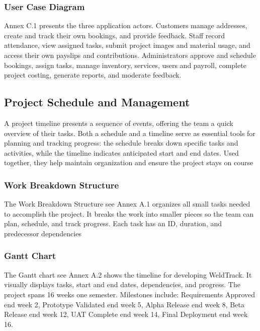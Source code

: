 \documentclass[12pt, letterpaper]{article}
\begin{document}

\subsubsection{User Case Diagram}
\hspace*{2em} Annex C.1 presents the three application actors. Customers manage addresses, create and track their own bookings, and provide feedback. Staff record attendance, view assigned tasks, submit project images and material usage, and access their own payslips and contributions. Administrators approve and schedule bookings, assign tasks, manage inventory, services, users and payroll, complete project costing, generate reports, and moderate feedback.

\subsection{Project Schedule and Management}
\hspace*{2em} A project timeline presents a sequence of events, offering the team a quick overview of their tasks. Both a schedule and a timeline serve as essential tools for planning and tracking progress: the schedule breaks down specific tasks and activities, while the timeline indicates anticipated start and end dates. Used together, they help maintain organization and ensure the project stays on course

\subsubsection{Work Breakdown Structure}
\hspace*{2em} The Work Breakdown Structure see Annex A.1 organizes all small tasks needed to accomplish the project. It breaks the work into smaller pieces so the team can plan, schedule, and track progress. Each task has an ID, duration, and predecessor dependencies

\subsubsection{Gantt Chart}
\hspace*{2em} The Gantt chart see Annex A.2 shows the timeline for developing WeldTrack. It visually displays tasks, start and end dates, dependencies, and progress. The project spans 16 weeks one semester. Milestones include: Requirements Approved end week 2, Prototype Validated end week 5, Alpha Release end week 8, Beta Release end week 12, UAT Complete end week 14, Final Deployment end week 16.
\end{document}
